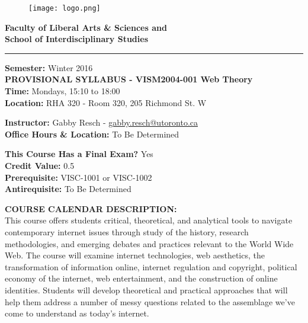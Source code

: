 \documentclass[10pt]{article}
\begin{document}
\begin{figure}
	\raggedleft
	\texttt{[image: logo.png]}
\end{figure}

\textbf{\LARGE{Faculty of Liberal Arts \& Sciences and \\
School of Interdisciplinary Studies}}\newline
\rule{\textwidth}{1pt}

\textbf{Semester:} Winter 2016\\
\textbf{PROVISIONAL SYLLABUS - VISM2004-001 Web Theory}\\
\textbf{Time:} Mondays, 15:10 to 18:00\\
\textbf{Location:} RHA 320 - Room 320, 205 Richmond St. W

\textbf{Instructor:} Gabby Resch - \href{mailto:gabby.resch@utoronto.ca}{gabby.resch@utoronto.ca}\\
\textbf{Office Hours \& Location:} To Be Determined

\textbf{This Course Has a Final Exam?} Yes\\
\textbf{Credit Value:} 0.5\\
\textbf{Prerequisite:} VISC-1001 or VISC-1002\\
\textbf{Antirequisite:} To Be Determined

\textbf{COURSE CALENDAR DESCRIPTION:}\\
This course offers students critical, theoretical, and analytical tools to navigate contemporary internet issues through study of the history, research methodologies, and emerging debates and practices relevant to the World Wide Web. The course will examine internet technologies, web aesthetics, the transformation of information online, internet regulation and copyright, political economy of the internet, web entertainment, and the construction of online identities. Students will develop theoretical and practical approaches that will help them address a number of messy questions related to the assemblage we've come to understand as today's internet.
\end{document}
